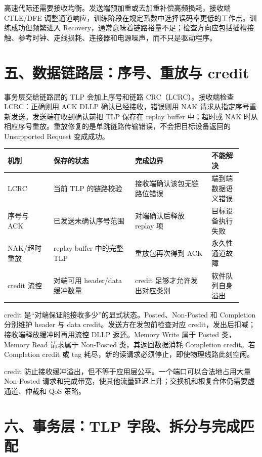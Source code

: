 高速代际还需要接收均衡。发送端预加重或去加重补偿高频损耗，接收端 CTLE/DFE 调整通道响应，训练阶段在规定系数中选择误码率更低的工作点。训练成功但频繁进入 Recovery，通常意味着链路裕量不足；检查方向应包括插槽接触、参考时钟、走线损耗、连接器和电源噪声，而不只是驱动程序。

\section{五、数据链路层：序号、重放与 credit}

事务层交给链路层的 TLP 会加上序号和链路 CRC（LCRC）。接收端检查 LCRC：正确则用 ACK DLLP 确认已经接收，错误则用 NAK 请求从指定序号重新发送。发送端在收到确认前把 TLP 保存在 replay buffer 中；超时或 NAK 时从相应序号重放。重放修复的是单跳链路传输错误，不会把目标设备返回的 Unsupported Request 变成成功。

\begin{longtable}{L{0.18\linewidth}L{0.32\linewidth}L{0.30\linewidth}L{0.12\linewidth}}
\toprule
机制 & 保存的状态 & 完成边界 & 不能解决 \\
\midrule
LCRC & 当前 TLP 的链路校验 & 接收端确认该包无链路位错误 & 端到端数据语义错误 \\\tablerowrule
序号与 ACK & 已发送未确认序号范围 & 对端确认后释放 replay 项 & 目标设备执行失败 \\\tablerowrule
NAK/超时重放 & replay buffer 中的完整 TLP & 重放包再次得到 ACK & 永久性通道故障 \\\tablerowrule
credit 流控 & 对端可用 header/data 缓冲数量 & credit 足够才允许发出对应类别 & 软件队列自身溢出 \\
\bottomrule
\end{longtable}

credit 是“对端保证能接收多少”的显式状态。Posted、Non-Posted 和 Completion 分别维护 header 与 data credit。发送方在发包前检查对应 credit，发出后扣减；接收端释放缓冲时再用流控 DLLP 返还。Memory Write 属于 Posted 类，Memory Read 请求属于 Non-Posted 类，其返回数据消耗 Completion credit。若 Completion credit 或 tag 耗尽，新的读请求必须停止，即使物理线路此刻空闲。

credit 防止接收缓冲溢出，但不等于应用层公平。一个端口可以合法地占用大量 Non-Posted 请求和完成带宽，使其他流量延迟上升；交换机和根复合体仍需要虚通道、仲裁和 QoS 策略。

\section{六、事务层：TLP 字段、拆分与完成匹配}

